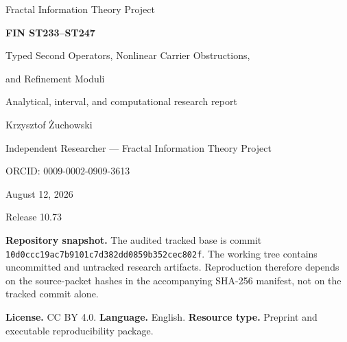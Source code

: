 \documentclass[11pt,a4paper]{article}
\begin{document}
\hypersetup{pageanchor=false}

\begin{titlepage}
\centering
\vspace*{1.0cm}
{\Large Fractal Information Theory Project\par}
\vspace{0.9cm}
{\huge\bfseries FIN ST233--ST247\par}
\vspace{0.4cm}
{\LARGE Typed Second Operators, Nonlinear Carrier Obstructions,\par}
{\LARGE and Refinement Moduli\par}
\vspace{1.0cm}
{\large Analytical, interval, and computational research report\par}
\vfill
{\Large Krzysztof \.{Z}uchowski\par}
\vspace{0.2cm}
{\large Independent Researcher --- Fractal Information Theory Project\par}
{\large ORCID: 0009-0002-0909-3613\par}
\vspace{0.8cm}
{\large August 12, 2026\par}
\vspace{0.3cm}
{\large Release 10.73\par}
\vfill
\begin{minipage}{0.92\textwidth}
\small
\textbf{Repository snapshot.} The audited tracked base is commit
\texttt{10d0ccc19ac7b9101c7d382dd0859b352cec802f}. The working tree contains
uncommitted and untracked research artifacts. Reproduction therefore depends on the
source-packet hashes in the accompanying SHA-256 manifest, not on the tracked commit alone.

\medskip
\textbf{License.} CC BY 4.0. \quad \textbf{Language.} English. \quad
\textbf{Resource type.} Preprint and executable reproducibility package.
\end{minipage}
\end{titlepage}
\hypersetup{pageanchor=true}
\end{document}
